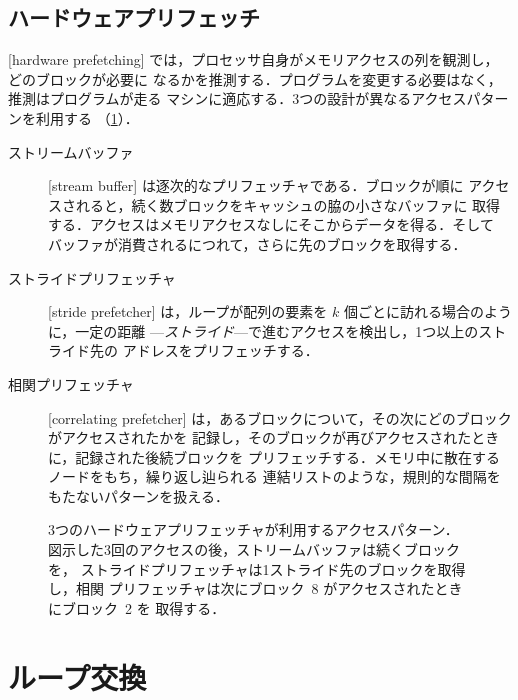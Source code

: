 \documentclass[../main.tex]{subfiles}
\begin{document}
\subsection{ハードウェアプリフェッチ}

[hardware prefetching]%
では，プロセッサ自身がメモリアクセスの列を観測し，どのブロックが必要に
なるかを推測する．プログラムを変更する必要はなく，推測はプログラムが走る
マシンに適応する．3つの設計が異なるアクセスパターンを利用する
（\cref{fig:l14-prefetchers}）．
\begin{description}
  \item[ストリームバッファ] [stream buffer]
    \cite{jouppi1990} は逐次的なプリフェッチャである．ブロックが順に
    アクセスされると，続く数ブロックをキャッシュの脇の小さなバッファに
    取得する．アクセスはメモリアクセスなしにそこからデータを得る．そして
    バッファが消費されるにつれて，さらに先のブロックを取得する．
  \item[ストライドプリフェッチャ] [stride prefetcher]%
    は，ループが配列の要素を $k$ 個ごとに訪れる場合のように，一定の距離
    ---\emph{ストライド}---で進むアクセスを検出し，1つ以上のストライド先の
    アドレスをプリフェッチする．
  \item[相関プリフェッチャ] [correlating prefetcher]%
    は，あるブロックについて，その次にどのブロックがアクセスされたかを
    記録し，そのブロックが再びアクセスされたときに，記録された後続ブロックを
    プリフェッチする．メモリ中に散在するノードをもち，繰り返し辿られる
    連結リストのような，規則的な間隔をもたないパターンを扱える．
\end{description}

\begin{figure}[htbp]
  \centering
  
  \caption{3つのハードウェアプリフェッチャが利用するアクセスパターン．
    図示した3回のアクセスの後，ストリームバッファは続くブロックを，
    ストライドプリフェッチャは1ストライド先のブロックを取得し，相関
    プリフェッチャは次にブロック~8 がアクセスされたときにブロック~2 を
    取得する．}
  \label{fig:l14-prefetchers}
\end{figure}

\section{ループ交換}
\label{sec:l14-loop-interchange}
\end{document}
